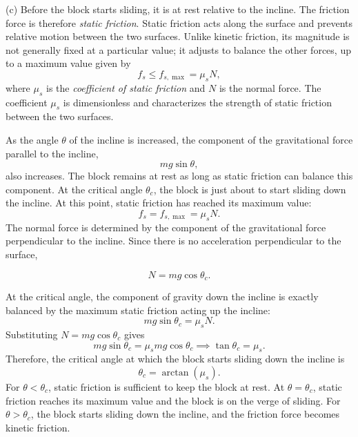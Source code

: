 \documentclass[12pt]{article}
\begin{document}
(c) Before the block starts sliding, it is at rest relative to the incline. The friction force is therefore \emph{static friction}. Static friction acts along the surface and prevents relative motion between the two surfaces. Unlike kinetic friction, its magnitude is not generally fixed at a particular value; it adjusts to balance the other forces, up to a maximum value given by
\begin{equation}
f_s \leq f_{s,\max}=\mu_s N,
\end{equation}
where $\mu_s$ is the \emph{coefficient of static friction} and $N$ is the normal force. The coefficient $\mu_s$ is dimensionless and characterizes the strength of static friction between the two surfaces.

As the angle $\theta$ of the incline is increased, the component of the gravitational force parallel to the incline,
\begin{equation}
mg\sin\theta,
\end{equation}
also increases. The block remains at rest as long as static friction can balance this component. At the critical angle $\theta_c$, the block is just about to start sliding down the incline. At this point, static friction has reached its maximum value:
\begin{equation}
f_s=f_{s,\max}=\mu_sN.
\end{equation}
The normal force is determined by the component of the gravitational force perpendicular to the incline. Since there is no acceleration perpendicular to the surface,

\begin{equation}
N=mg\cos\theta_c.
\end{equation}

At the critical angle, the component of gravity down the incline is exactly balanced by the maximum static friction acting up the incline:
\begin{equation}
mg\sin\theta_c=\mu_sN.
\end{equation}
Substituting $N=mg\cos\theta_c$ gives
\begin{equation}
mg\sin\theta_c
=\mu_s mg\cos\theta_c \implies \tan\theta_c=\mu_s.
\end{equation}
Therefore, the critical angle at which the block starts sliding down the incline is
\begin{equation}
\boxed{\theta_c=\arctan(\mu_s)}.
\end{equation}
For $\theta<\theta_c$, static friction is sufficient to keep the block at rest. At $\theta=\theta_c$, static friction reaches its maximum value and the block is on the verge of sliding. For $\theta>\theta_c$, the block starts sliding down the incline, and the friction force becomes kinetic friction.
\end{document}
